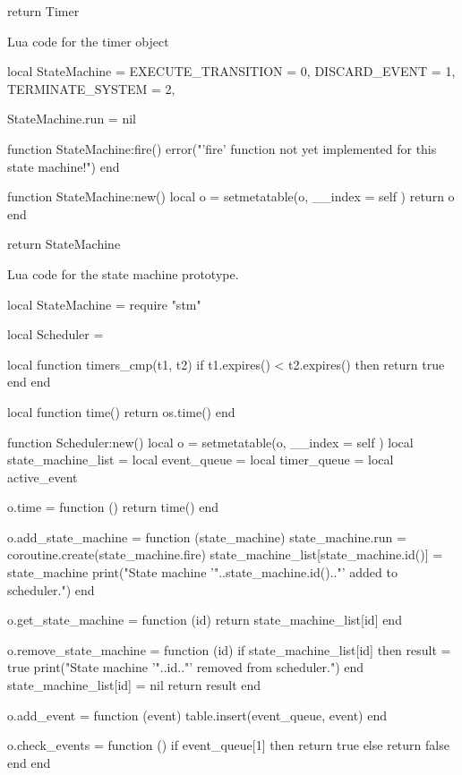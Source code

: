 \begin{appendices}
\begin{listing}[H]
\begin{luacode}
return Timer
\end{luacode}
	\caption{Lua code for the timer object }
	\label{code:timer}
\end{listing}

\begin{listing}[H]
\begin{luacode}
local StateMachine = {
	EXECUTE_TRANSITION = 0,
	DISCARD_EVENT = 1,
	TERMINATE_SYSTEM = 2,
}

StateMachine.run = nil

function StateMachine:fire()
	error("'fire' function not yet implemented for this state machine!")
end

function StateMachine:new()
	local o = {}
	setmetatable(o, { __index = self })
	return o
end

return StateMachine
\end{luacode}
	\caption{Lua code for the state machine prototype.}
	\label{code:stm}
\end{listing}

\begin{listing}[H]
\begin{luacode}
local StateMachine = require "stm"

local Scheduler = {}

local function timers_cmp(t1, t2)
	if t1.expires() < t2.expires() then return true end
end

local function time()
	return os.time()
end

function Scheduler:new()
	local o = {}
	setmetatable(o, { __index = self })
	local state_machine_list = {}
	local event_queue = {}
	local timer_queue = {}
	local active_event

	o.time = function ()
		return time()
	end

	o.add_state_machine = function (state_machine)
		state_machine.run = coroutine.create(state_machine.fire)
		state_machine_list[state_machine.id()] = state_machine
		print("State machine '"..state_machine.id().."' added to scheduler.")
	end

	o.get_state_machine = function (id)
		return state_machine_list[id]
	end

	o.remove_state_machine = function (id)
		if state_machine_list[id] then
			result = true
			print("State machine '"..id.."' removed from scheduler.")
		end
		state_machine_list[id] = nil
		return result
	end

	o.add_event = function (event)
		table.insert(event_queue, event)
	end

	o.check_events = function ()
		if event_queue[1] then return true
		else return false end
	end


\end{luacode}
\end{listing}
\end{appendices}
